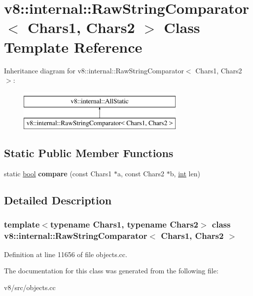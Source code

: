 \hypertarget{classv8_1_1internal_1_1RawStringComparator}{}\section{v8\+:\+:internal\+:\+:Raw\+String\+Comparator$<$ Chars1, Chars2 $>$ Class Template Reference}
\label{classv8_1_1internal_1_1RawStringComparator}
Inheritance diagram for v8\+:\+:internal\+:\+:Raw\+String\+Comparator$<$ Chars1, Chars2 $>$\+:\begin{figure}[H]
\begin{center}
\leavevmode
\includegraphics[height=2.000000cm]{classv8_1_1internal_1_1RawStringComparator}
\end{center}
\end{figure}
\subsection*{Static Public Member Functions}
\begin{DoxyCompactItemize}
\item 
\mbox{\label{classv8_1_1internal_1_1RawStringComparator_ae347b3b0e50985f71e1cba006255acf2}} 
static \mbox{\hyperlink{classbool}{bool}} {\bfseries compare} (const Chars1 $\ast$a, const Chars2 $\ast$b, \mbox{\hyperlink{classint}{int}} len)
\end{DoxyCompactItemize}


\subsection{Detailed Description}
\subsubsection*{template$<$typename Chars1, typename Chars2$>$\newline
class v8\+::internal\+::\+Raw\+String\+Comparator$<$ Chars1, Chars2 $>$}



Definition at line 11656 of file objects.\+cc.



The documentation for this class was generated from the following file\+:\begin{DoxyCompactItemize}
\item 
v8/src/objects.\+cc\end{DoxyCompactItemize}
